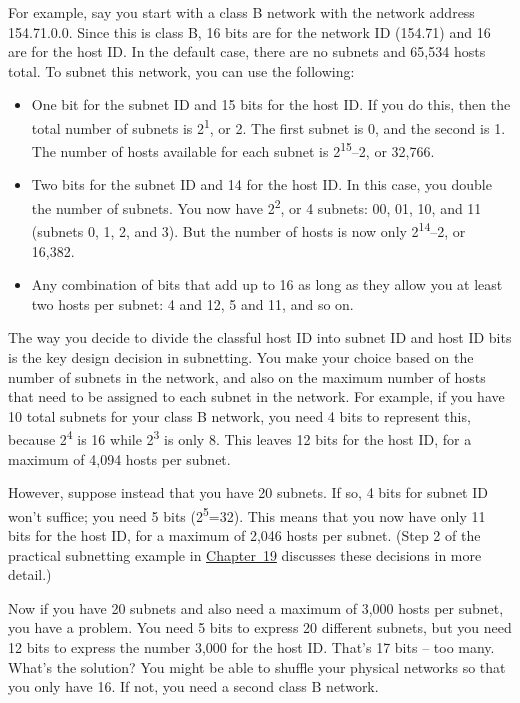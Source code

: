For example, say you start with a class B network with the network
address 154.71.0.0. Since this is class B, 16 bits are for the network
ID (154.71) and 16 are for the host ID. In the default case, there are
no subnets and 65,534 hosts total. To subnet this network, you can use
the following:

\begin{itemize}
\item
  One bit for the subnet ID and 15 bits for the host ID. If you do this,
  then the total number of subnets is 2\textsuperscript{1}, or 2. The
  first subnet is 0, and the second is 1. The number of hosts available
  for each subnet is 2\textsuperscript{15}--2, or 32,766.
\item
  Two bits for the subnet ID and 14 for the host ID. In this case, you
  double the number of subnets. You now have 2\textsuperscript{2}, or 4
  subnets: 00, 01, 10, and 11 (subnets 0, 1, 2, and 3). But the number
  of hosts is now only 2\textsuperscript{14}--2, or 16,382.
\item
  Any combination of bits that add up to 16 as long as they allow you at
  least two hosts per subnet: 4 and 12, 5 and 11, and so on.
\end{itemize}

The way you decide to divide the classful host ID into subnet ID and
host ID bits is the key design decision in subnetting. You make your
choice based on the number of subnets in the network, and also on the
maximum number of hosts that need to be assigned to each subnet in the
network. For example, if you have 10 total subnets for your class B
network, you need 4 bits to represent this, because 2\textsuperscript{4}
is 16 while 2\textsuperscript{3} is only 8. This leaves 12 bits for the
host ID, for a maximum of 4,094 hosts per subnet.

However, suppose instead that you have 20 subnets. If so, 4 bits for
subnet ID won't suffice; you need 5 bits (2\textsuperscript{5}=32). This
means that you now have only 11 bits for the host ID, for a maximum of
2,046 hosts per subnet. (Step 2 of the practical subnetting example in
\protect\hyperlink{ch19.html}{Chapter~19} discusses these decisions in
more detail.)

Now if you have 20 subnets and also need a maximum of 3,000 hosts per
subnet, you have a problem. You need 5 bits to express 20 different
subnets, but you need 12 bits to express the number 3,000 for the host
ID. That's 17 bits -- too many. What's the solution? You might be able to
shuffle your physical networks so that you only have 16. If not, you
need a second class B network.


